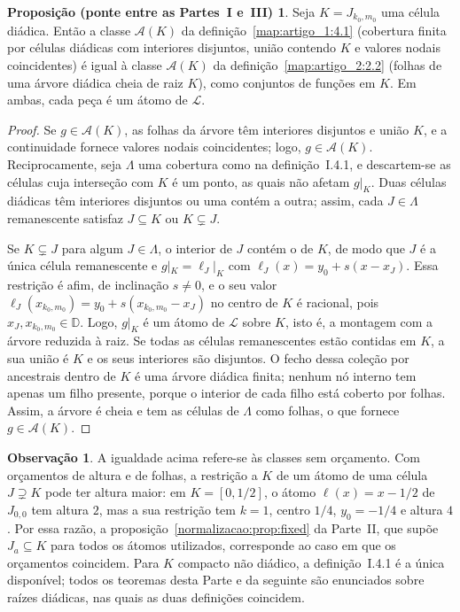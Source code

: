 \documentclass[12pt,a4paper]{article}
\theoremstyle{preciso}
\theoremstyle{definition}
\newcommand{\Aclass}{\mathcal{A}}
\newcommand{\Library}{\mathcal{L}}
\theoremstyle{preciso}
\theoremstyle{preciso}
\theoremstyle{preciso}
\theoremstyle{preciso}
\theoremstyle{definition}
\theoremstyle{preciso}
\theoremstyle{definition}
\theoremstyle{preciso}
\newtheorem*{proposicaoSN}{Proposição (ponte entre as Partes~I e~III)}
\theoremstyle{preciso}
\theoremstyle{definition}
\newtheorem*{observacaoSN}{Observação}
\begin{document}
\begin{proposicaoSN}\label{artigo_2:prop:bridge-part1}
Seja $K=J_{k_0,m_0}$ uma célula diádica. Então a classe $\mathcal A(K)$ da definição~\ref{map:artigo_1:4.1} (cobertura finita por células diádicas com interiores disjuntos, união contendo $K$ e valores nodais coincidentes) é igual à classe $\Aclass(K)$ da definição~\ref{map:artigo_2:2.2} (folhas de uma árvore diádica cheia de raiz $K$), como conjuntos de funções em $K$. Em ambas, cada peça é um átomo de $\Library$.
\end{proposicaoSN}
\begin{proof}
Se $g\in\Aclass(K)$, as folhas da árvore têm interiores disjuntos e união $K$, e a continuidade fornece valores nodais coincidentes; logo, $g\in\mathcal A(K)$. Reciprocamente, seja $\Lambda$ uma cobertura como na definição~I.4.1, e descartem-se as células cuja interseção com $K$ é um ponto, as quais não afetam $g|_K$. Duas células diádicas têm interiores disjuntos ou uma contém a outra; assim, cada $J\in\Lambda$ remanescente satisfaz $J\subseteq K$ ou $K\subsetneq J$.

Se $K\subsetneq J$ para algum $J\in\Lambda$, o interior de $J$ contém o de $K$, de modo que $J$ é a única célula remanescente e $g|_K=\ell_J|_K$ com $\ell_J(x)=y_0+s(x-x_J)$. Essa restrição é afim, de inclinação $s\ne0$, e o seu valor $\ell_J(x_{k_0,m_0})=y_0+s(x_{k_0,m_0}-x_J)$ no centro de $K$ é racional, pois $x_J,x_{k_0,m_0}\in\mathbb D$. Logo, $g|_K$ é um átomo de $\Library$ sobre $K$, isto é, a montagem com a árvore reduzida à raiz. Se todas as células remanescentes estão contidas em $K$, a sua união é $K$ e os seus interiores são disjuntos. O fecho dessa coleção por ancestrais dentro de $K$ é uma árvore diádica finita; nenhum nó interno tem apenas um filho presente, porque o interior de cada filho está coberto por folhas. Assim, a árvore é cheia e tem as células de $\Lambda$ como folhas, o que fornece $g\in\Aclass(K)$.
\end{proof}
\begin{observacaoSN}
A igualdade acima refere-se às classes sem orçamento. Com orçamentos de altura e de folhas, a restrição a $K$ de um átomo de uma célula $J\supsetneq K$ pode ter altura maior: em $K=[0,1/2]$, o átomo $\ell(x)=x-1/2$ de $J_{0,0}$ tem altura $2$, mas a sua restrição tem $k=1$, centro $1/4$, $y_0=-1/4$ e altura $4$. Por essa razão, a proposição~\ref{normalizacao:prop:fixed} da Parte~II, que supõe $J_a\subseteq K$ para todos os átomos utilizados, corresponde ao caso em que os orçamentos coincidem. Para $K$ compacto não diádico, a definição~I.4.1 é a única disponível; todos os teoremas desta Parte e da seguinte são enunciados sobre raízes diádicas, nas quais as duas definições coincidem.
\end{observacaoSN}
\end{document}
